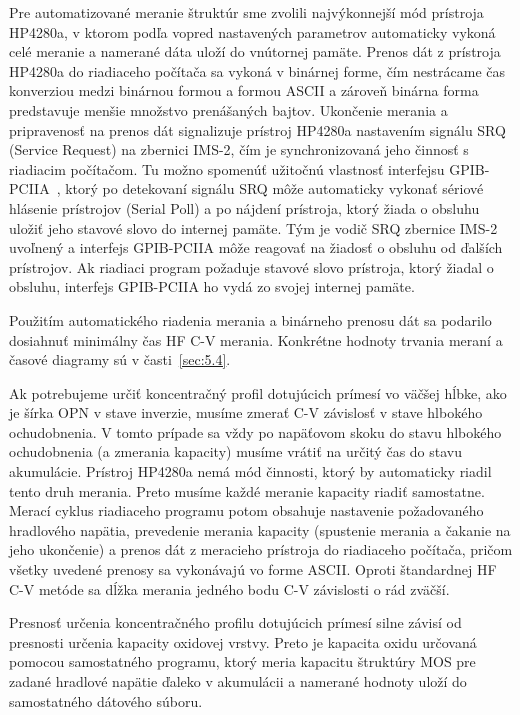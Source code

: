 Pre automatizované meranie štruktúr sme zvolili najvýkonnejší mód
prístroja HP4280a, v ktorom podľa vopred nastavených parametrov
automaticky vykoná celé meranie a namerané dáta uloží do vnútornej
pamäte.  Prenos dát z prístroja HP4280a do riadiaceho počítača sa
vykoná v binárnej forme, čím nestrácame čas konverziou medzi binárnou
formou a formou ASCII a zároveň binárna forma predstavuje menšie
množstvo prenášaných bajtov. Ukončenie merania a pripravenosť na
prenos dát signalizuje prístroj HP4280a nastavením signálu SRQ
(Service Request) na zbernici IMS-2, čím je synchronizovaná jeho
činnosť s riadiacim počítačom.  Tu možno spomenúť užitočnú vlastnosť
interfejsu GPIB-PCIIA~\cite{5.2}, ktorý po detekovaní signálu SRQ môže
automaticky vykonať sériové hlásenie prístrojov (Serial Poll) a po
nájdení prístroja, ktorý žiada o obsluhu uložiť jeho stavové slovo do
internej pamäte. Tým je vodič SRQ zbernice IMS-2 uvoľnený a interfejs
GPIB-PCIIA môže reagovať na žiadosť o obsluhu od ďalších
prístrojov. Ak riadiaci program požaduje stavové slovo prístroja,
ktorý žiadal o obsluhu, interfejs GPIB-PCIIA ho vydá zo svojej
internej pamäte.

Použitím automatického riadenia merania a binárneho prenosu dát sa
podarilo dosiahnuť minimálny čas HF C-V merania.  Konkrétne hodnoty
trvania meraní a časové diagramy sú v časti~\ref{sec:5.4}.

Ak potrebujeme určiť koncentračný profil dotujúcich prímesí vo väčšej
hĺbke, ako je šírka OPN v stave inverzie, musíme zmerať C-V závislosť
v stave hlbokého ochudobnenia. V tomto prípade sa vždy po napäťovom
skoku do stavu hlbokého ochudobnenia (a zmerania kapacity) musíme
vrátiť na určitý čas do stavu akumulácie. Prístroj HP4280a nemá mód
činnosti, ktorý by automaticky riadil tento druh merania. Preto musíme
každé meranie kapacity riadiť samostatne. Merací cyklus riadiaceho
programu potom obsahuje nastavenie požadovaného hradlového napätia,
prevedenie merania kapacity (spustenie merania a čakanie na jeho
ukončenie) a prenos dát z meracieho prístroja do riadiaceho počítača,
pričom všetky uvedené prenosy sa vykonávajú vo forme ASCII\@. Oproti
štandardnej HF C-V metóde sa dĺžka merania jedného bodu C-V závislosti
o rád zväčší.

Presnosť určenia koncentračného profilu dotujúcich prímesí silne
závisí od presnosti určenia kapacity oxidovej vrstvy.  Preto je
kapacita oxidu určovaná pomocou samostatného programu, ktorý meria
kapacitu štruktúry MOS pre zadané hradlové napätie ďaleko v akumulácii
a namerané hodnoty uloží do samostatného dátového súboru.

